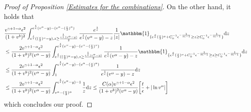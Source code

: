 \documentclass[11pt]{article}
\numberwithin{equation}{section}
\newcommand{\der}{\textup{d}}
\begin{document}
\begin{proof}[Proof of Proposition \ref{Estimates for the combinations}]
On the other hand, it holds that
\begin{align}\label{estimate L part two}
 &  \frac{ v^{\gamma+1-\alpha}\epsilon^{2} }{(1+v^{b})^{2}}\int_{e^{\frac{t}{\epsilon}}((\frac{v}{2})^{\alpha}-y), z\geq  \frac{e^{\frac{t}{\epsilon}}(v^{\alpha}-y)}{2}}^{e^{\frac{t}{\epsilon}}(v^{\alpha}-y)-(v^{\alpha}-(\frac{v}{2})^{\alpha})}\frac{e^{\frac{t}{\epsilon}}}{e^{\frac{t}{\epsilon}}(v^{\alpha}-y)-z}\frac{1}{|z|} \mathbbm{1}_{\{e^{\frac{s}{\epsilon}}(\frac{v}{2})^{\alpha}+C_{0}^{-1}\epsilon^{-\frac{1}{m-1}}\geq z\geq C_{0}^{-1}\epsilon^{-\frac{1}{m-1}}\}}\der z\nonumber\\
   &\leq \frac{2 v^{\gamma+1-\alpha}\epsilon^{2} }{(1+v^{b})^{2}(v^{\alpha}-y)}\int_{e^{\frac{t}{\epsilon}}((\frac{v}{2})^{\alpha}-y), z\geq \frac{e^{\frac{t}{\epsilon}}(v^{\alpha}-y)}{2}}^{e^{\frac{t}{\epsilon}}(v^{\alpha}-y)-(v^{\alpha}-(\frac{v}{2})^{\alpha})}\frac{1}{e^{\frac{t}{\epsilon}}(v^{\alpha}-y)-z}\mathbbm{1}_{\{e^{\frac{s}{\epsilon}}(\frac{v}{2})^{\alpha}+C_{0}^{-1}\epsilon^{-\frac{1}{m-1}}\geq z\geq C_{0}^{-1}\epsilon^{-\frac{1}{m-1}}\}}\der z\nonumber\\
   &\leq \frac{2 v^{\gamma+1-\alpha}\epsilon^{2} }{(1+v^{b})^{2}(v^{\alpha}-y)}\int_{1}^{e^{\frac{t}{\epsilon}}(v^{\alpha}-y)-(v^{\alpha}-(\frac{v}{2})^{\alpha})}\frac{1}{e^{\frac{t}{\epsilon}}(v^{\alpha}-y)-z}\der z\nonumber\\
    &\leq \frac{2 v^{\gamma+1-\alpha}\epsilon^{2} }{(1+v^{b})^{2}(v^{\alpha}-y)}\int_{v^{\alpha}-(\frac{v}{2})^{\alpha}}^{e^{\frac{t}{\epsilon}}(v^{\alpha}-y)-1}\frac{1}{z}\der z\leq \frac{C(\alpha) v^{\gamma+1-\alpha}\epsilon^{2} }{(1+v^{b})^{2}(v^{\alpha}-y)}\bigg[\frac{t}{\epsilon}+|\ln{v^{\alpha}}|\bigg]
\end{align}
which concludes our proof.

\end{proof}
\end{document}
